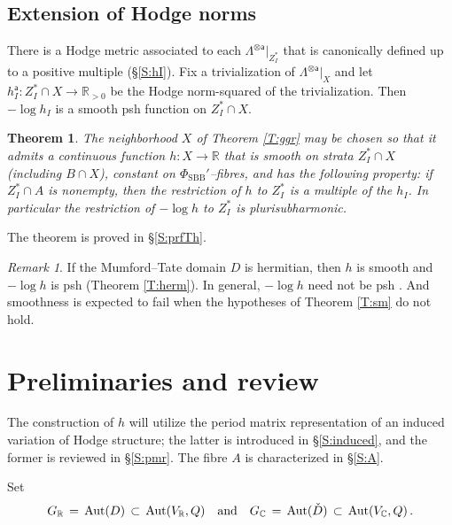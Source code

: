 \documentclass[12pt]{amsart}
\numberwithin{equation}{section}
\numberwithin{table}{section}
\def\tAut{\mathrm{Aut}}
\def\sfa{\mathsf{a}}
\def\bC{\mathbb{C}}
\def\bR{\mathbb{R}}
\def\tand{\quad\hbox{and}\quad}
\def\ot{\otimes}
\newtheorem{theorem}[equation]{Theorem}
\theoremstyle{definition}
\theoremstyle{definition}
\theoremstyle{remark}
\newtheorem{remark}[equation]{Remark}
\def\hPhiS{\Phi_\mathrm{SBB}'}
\begin{document}
\subsection{Extension of Hodge norms} \label{S:extnh-intro}

There is a Hodge metric associated to each $\Lambda^{\ot \sfa}\big|_{Z_I^*}$ that is canonically defined up to a positive multiple (\S\ref{S:hI}).  Fix a trivialization of $\Lambda^{\ot \sfa}\big|_X$ and let $h_I^\sfa : Z_I^* \cap X \to \bR_{>0}$ be the Hodge norm-squared of the trivialization.  Then $-\log h_I$ is a smooth psh function on $Z_I^* \cap X$.

\begin{theorem} \label{T:h}
The neighborhood $X$ of Theorem \ref{T:ggr} may be chosen so that it admits a continuous function $h : X \to \bR$ that is smooth on strata $Z_I^* \cap X$ \emph{(}including $B \cap X$\emph{)}, constant on $\hPhiS$--fibres, and has the following property: if $Z_I^* \cap A$ is nonempty, then the restriction of $h$ to $Z_I^*$ is a multiple of the $h_I$.  In particular the restriction of $-\log h$ to $Z_I^*$ is plurisubharmonic.
\end{theorem}

\noindent  The theorem is proved in \S\ref{S:prfTh}.

\begin{remark}
If the Mumford--Tate domain $D$ is hermitian, then $h$ is smooth and $-\log h$ is psh (Theorem \ref{T:herm}).  In general, $-\log h$ need not be psh \cite{Robles-pseudocnvx-eg}.  And smoothness is expected to fail when the hypotheses of Theorem \ref{T:sm} do not hold.
\end{remark}

\section{Preliminaries and review} \label{S:prelim}

The construction of $h$ will utilize the period matrix representation of an induced variation of Hodge structure; the latter is introduced in \S\ref{S:induced}, and the former is reviewed in \S\ref{S:pmr}.  The fibre $A$ is characterized in \S\ref{S:A}.

Set
\[
  G_\bR \,=\, \tAut(D) \,\subset\, \tAut(V_\bR,Q)
  \tand 
  G_\bC \,=\, \tAut(\check D) \,\subset\, \tAut(V_\bC,Q) \,.
\]
\end{document}
